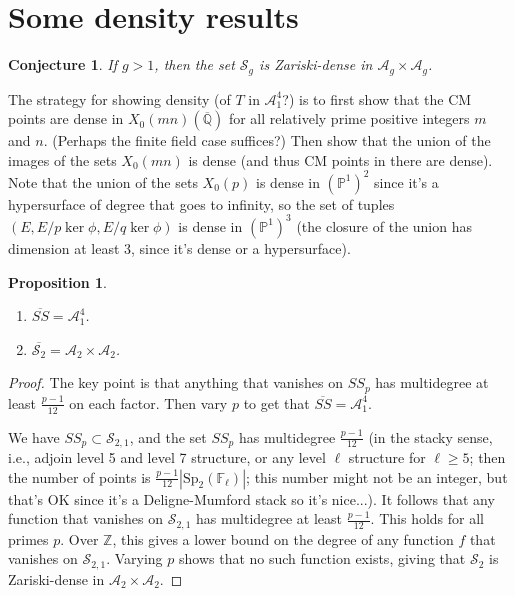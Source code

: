 \documentclass{amsart}
\def\Z{\mathbb{Z}}
\def\Q{\mathbb{Q}}
\def\F{\mathbb{F}}
\def\SS{{\mathcal S}}
\def\P{\mathbb{P}}
\def\AA{{\mathcal A}}
\def\Sp{\mathrm{Sp}}
\def\F{{\mathbb F}}
\numberwithin{equation}{section}
\newtheorem{prop}[thm]{Proposition}
\newtheorem{conj}[thm]{Conjecture}
\theoremstyle{definition}
\begin{document}
\section{Some density results}

\begin{conj}
If $g > 1$, then the set $\SS_g$ is Zariski-dense in $\AA_g \times \AA_g$.
\end{conj}

The strategy for showing density (of $T$ in $\AA_1^4$?) is to first show that the CM points are dense in $X_0(mn)(\overline{\Q})$ for all relatively prime positive integers $m$ and $n$. (Perhaps the finite field case suffices?) Then show that the union of the images of the sets $X_0(mn)$ is dense (and thus CM points in there are dense). Note that the union of the sets $X_0(p)$ is dense in $(\P^1)^2$ since it's a hypersurface of degree that goes to infinity, so the set of tuples $(E,E/p\ker \phi,E/q\ker \phi)$ is dense in $(\P^1)^3$ (the closure of the union has dimension at least 3, since it's dense or a hypersurface).




\begin{prop}
\label{S2A2}
\begin{enumerate}
\item
$\overline{SS} = \AA_1^4$.
\item
$\overline{\SS_2} = \AA_2 \times \AA_2$.
\end{enumerate}
\end{prop}

\begin{proof}
The key point is that anything that vanishes on $SS_p$ has multidegree at least ${\frac{p-1}{12}}$ on each factor.
Then vary $p$ to get that $\overline{SS} = \AA_1^4$.

We have $SS_p \subset \SS_{2,1}$, and the set $SS_p$ has multidegree ${\frac{p-1}{12}}$ (in the stacky sense, i.e., adjoin level 5 and level 7 structure, or any level $\ell$ structure for $\ell \ge 5$; then the number of points is ${\frac{p-1}{12}}|\Sp_2(\F_\ell)|$; this number might not be an integer, but that's OK since it's a Deligne-Mumford stack so it's nice...).
It follows that any function that vanishes on $\SS_{2,1}$ has multidegree at least ${\frac{p-1}{12}}$. This holds for all primes $p$. Over $\Z$, this gives a lower bound on the degree of any function $f$ that vanishes on $\SS_{2,1}$.
Varying $p$ shows that no such function exists, giving that $\SS_2$ is Zariski-dense in $\AA_2 \times \AA_2$.
\end{proof}
\end{document}
